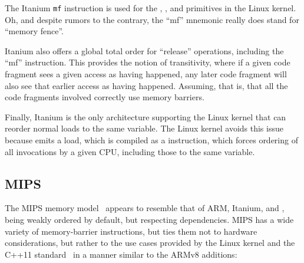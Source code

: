 The Itanium {\tt mf} instruction is used for the ,
, and  primitives in the Linux kernel.
Oh, and despite rumors to the contrary, the ``mf'' mnemonic really
does stand for ``memory fence''.

Itanium also offers a global total order for ``release'' operations,
including the ``mf'' instruction.
This provides the notion of transitivity, where if a given code fragment
sees a given access as having happened, any later code fragment will
also see that earlier access as having happened.
Assuming, that is, that all the code fragments involved correctly use
memory barriers.

Finally, Itanium is the only architecture supporting the Linux kernel
that can reorder normal loads to the same variable.
The Linux kernel avoids this issue because  emits
a  load, which is compiled as a  instruction,
which forces ordering of all  invocations by a given
CPU, including those to the same variable.

\subsection{MIPS}

The MIPS memory model~\cite[page~479]{MIPSvII-A-2017}
appears to resemble that of ARM, Itanium, and \Power{},
being weakly ordered by default, but respecting dependencies.
MIPS has a wide variety of memory-barrier instructions, but ties them
not to hardware considerations, but rather to the use cases provided
by the Linux kernel and the C++11 standard~\cite{RichardSmith2015N4527}
in a manner similar to the ARMv8 additions:

